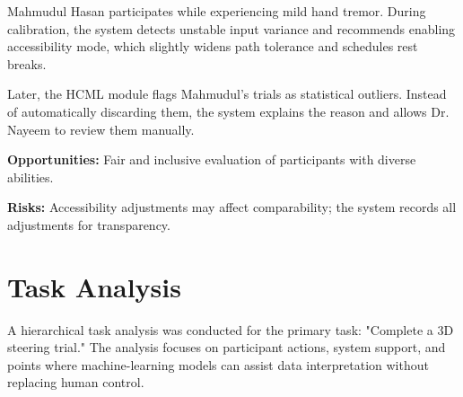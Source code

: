 \documentclass[sigconf]{acmart}
\begin{document}
Mahmudul Hasan participates while experiencing mild hand tremor. During calibration,
the system detects unstable input variance and recommends enabling accessibility mode,
which slightly widens path tolerance and schedules rest breaks.

Later, the HCML module flags Mahmudul’s trials as statistical outliers. Instead of
automatically discarding them, the system explains the reason and allows Dr. Nayeem
to review them manually.

\textbf{Opportunities:}
Fair and inclusive evaluation of participants with diverse abilities.

\textbf{Risks:}
Accessibility adjustments may affect comparability; the system records all adjustments
for transparency.




\section{Task Analysis}
A hierarchical task analysis was conducted for the primary task:
"Complete a 3D steering trial." The analysis focuses on participant actions,
system support, and points where machine-learning models can assist
data interpretation without replacing human control.
\end{document}
